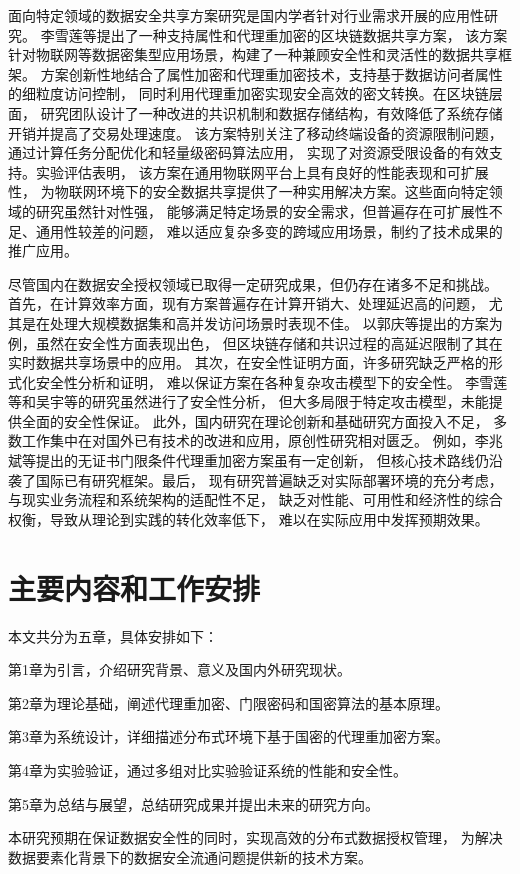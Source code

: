 面向特定领域的数据安全共享方案研究是国内学者针对行业需求开展的应用性研究。
李雪莲等提出了一种支持属性和代理重加密的区块链数据共享方案，
该方案针对物联网等数据密集型应用场景，构建了一种兼顾安全性和灵活性的数据共享框架。
方案创新性地结合了属性加密和代理重加密技术，支持基于数据访问者属性的细粒度访问控制，
同时利用代理重加密实现安全高效的密文转换。在区块链层面，
研究团队设计了一种改进的共识机制和数据存储结构，有效降低了系统存储开销并提高了交易处理速度。
该方案特别关注了移动终端设备的资源限制问题，通过计算任务分配优化和轻量级密码算法应用，
实现了对资源受限设备的有效支持。实验评估表明，
该方案在通用物联网平台上具有良好的性能表现和可扩展性，
为物联网环境下的安全数据共享提供了一种实用解决方案。这些面向特定领域的研究虽然针对性强，
能够满足特定场景的安全需求，但普遍存在可扩展性不足、通用性较差的问题，
难以适应复杂多变的跨域应用场景，制约了技术成果的推广应用。

尽管国内在数据安全授权领域已取得一定研究成果，但仍存在诸多不足和挑战。
首先，在计算效率方面，现有方案普遍存在计算开销大、处理延迟高的问题，
尤其是在处理大规模数据集和高并发访问场景时表现不佳。
以郭庆等提出的方案为例，虽然在安全性方面表现出色，
但区块链存储和共识过程的高延迟限制了其在实时数据共享场景中的应用。
其次，在安全性证明方面，许多研究缺乏严格的形式化安全性分析和证明，
难以保证方案在各种复杂攻击模型下的安全性。
李雪莲等和吴宇等的研究虽然进行了安全性分析，
但大多局限于特定攻击模型，未能提供全面的安全性保证。
此外，国内研究在理论创新和基础研究方面投入不足，
多数工作集中在对国外已有技术的改进和应用，原创性研究相对匮乏。
例如，李兆斌等提出的无证书门限条件代理重加密方案虽有一定创新，
但核心技术路线仍沿袭了国际已有研究框架。最后，
现有研究普遍缺乏对实际部署环境的充分考虑，与现实业务流程和系统架构的适配性不足，
缺乏对性能、可用性和经济性的综合权衡，导致从理论到实践的转化效率低下，
难以在实际应用中发挥预期效果。

\section{主要内容和工作安排}

本文共分为五章，具体安排如下：

第1章为引言，介绍研究背景、意义及国内外研究现状。

第2章为理论基础，阐述代理重加密、门限密码和国密算法的基本原理。

第3章为系统设计，详细描述分布式环境下基于国密的代理重加密方案。

第4章为实验验证，通过多组对比实验验证系统的性能和安全性。

第5章为总结与展望，总结研究成果并提出未来的研究方向。

本研究预期在保证数据安全性的同时，实现高效的分布式数据授权管理，
为解决数据要素化背景下的数据安全流通问题提供新的技术方案。

